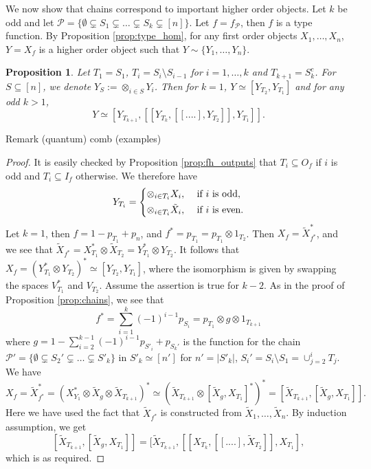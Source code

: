 \documentclass[12pt]{article}
\newtheorem{prop}{Proposition}
\theoremstyle{definition}
\theoremstyle{remark}
\def\Pe{\mathcal P}
\begin{document}
We now show that chains correspond to important higher order objects. Let $k$ be odd and let $\Pe=\{\emptyset\subsetneq S_1\subsetneq \dots
\subsetneq S_k\subsetneq [n]\}$. Let $f=f_\Pe$, then $f$ is a type function. By
Proposition \ref{prop:type_hom}, for any first order objects $X_1,\dots,X_n$, $Y=X_f$ is a
higher order object such that $Y\sim\{Y_1,\dots,Y_n\}$. 

\begin{prop}\label{prop:chains_combs}  Let $T_1=S_1$, $T_i=S_i\setminus S_{i-1}$ for
$i=1,\dots, k$ and $T_{k+1}=S_k^c$. For $S\subseteq [n]$, we denote  $Y_S:=\otimes_{i\in
S}Y_i$. Then for  $k=1$, $Y\simeq [Y_{T_2},Y_{T_1}]$ and for any odd $
k>1$, 
 \[
Y\simeq [Y_{T_{k+1}},[[Y_{T_k},[[....],Y_{T_2}]],Y_{T_1}]].
 \]
\end{prop}

Remark (quantum) comb (examples)

\begin{proof} It is easily checked by Proposition \ref{prop:fh_outputs} that $T_i\subseteq
O_f$ if  $i$ is odd and $T_i\subseteq I_f$ otherwise. We therefore have 
\[
Y_{T_i}=\begin{dcases} \otimes_{i\in T_i}X_i,  & \text{ if } i\text{ is odd},\\
\otimes_{i\in T_i}\tilde X_i,& \text{ if }i\text{ is even}.
\end{dcases}
\]
Let $k=1$, then $f=1-p_{T_1}+p_n$, and $f^*=p_{T_1}=p_{T_1}\otimes 1_{T_2}$. Then
$X_f=\tilde X_{f^*}^*$, and we see that $\tilde X_{f^*}= X_{T_1}^*\otimes \tilde
X_{T_2}=Y^*_{T_1}\otimes Y_{T_2}$. It
follows that $X_f= (Y_{T_1}^*\otimes Y_{T_2})^*\simeq [Y_{T_2}, Y_{T_1}]$, where the
isomorphism is given by swapping the spaces $V_{T_1}^*$ and $V_{T_2}$. Assume the assertion is
true for $k-2$. 
As in the proof of Proposition \ref{prop:chains}, we see that 
\[
f^*=\sum_{i=1}^k (-1)^{i-1}p_{S_i}=p_{T_1}\otimes g\otimes 1_{T_{k+1}}
\]
where $g=1-\sum_{i=2}^{k-1}(-1)^{i-1}p_{S'_i}+ p_{S_k'}$ is the function for the chain
$\Pe'=\{\emptyset\subsetneq S_2'\subsetneq \dots\subsetneq S'_k\}$ in $S'_k\simeq [n']$ for
 $n'=|S'_k|$, $S_i'=S_i\setminus S_1=\cup_{j=2}^i T_j$. We have 
\[
X_f=\tilde X^*_{f^*}=(X_{Y_1}^*\otimes \tilde X_g\otimes \tilde X_{T_{k+1}})^*\simeq (\tilde
X_{T_{k+1}}\otimes [\tilde X_g,X_{T_1}]^*)^*=[\tilde X_{T_{k+1}},[\tilde X_g,
X_{T_1}]].
\]
Here we have used the fact that $\tilde X_{f^*}$ is constructed from $\tilde
X_1,\dots,\tilde X_n$. By induction assumption, we get
\[
[\tilde X_{T_{k+1}},[\tilde X_g,X_{T_1}]]= [\tilde X_{T_{k+1}},[[X_{T_k},[[....],\tilde
X_{T_2}]],X_{T_1}],
\]
which is as required.



\end{proof}
\end{document}
